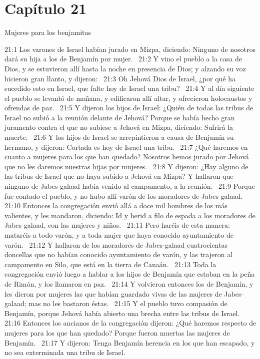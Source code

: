 \section*{Capítulo 21}
Mujeres para los benjamitas  

21:1 Los varones de Israel habían jurado en Mizpa, diciendo: Ninguno de nosotros dará su hija a los de Benjamín por mujer.  
21:2 Y vino el pueblo a la casa de Dios, y se estuvieron allí hasta la noche en presencia de Dios; y alzando su voz hicieron gran llanto, y dijeron:  
21:3 Oh Jehová Dios de Israel, ¿por qué ha sucedido esto en Israel, que falte hoy de Israel una tribu?  
21:4 Y al día siguiente el pueblo se levantó de mañana, y edificaron allí altar, y ofrecieron holocaustos y ofrendas de paz.  
21:5 Y dijeron los hijos de Israel: ¿Quién de todas las tribus de Israel no subió a la reunión delante de Jehová? Porque se había hecho gran juramento contra el que no subiese a Jehová en Mizpa, diciendo: Sufrirá la muerte.  
21:6 Y los hijos de Israel se arrepintieron a causa de Benjamín su hermano, y dijeron: Cortada es hoy de Israel una tribu.  
21:7 ¿Qué haremos en cuanto a mujeres para los que han quedado? Nosotros hemos jurado por Jehová que no les daremos nuestras hijas por mujeres.  
21:8 Y dijeron: ¿Hay alguno de las tribus de Israel que no haya subido a Jehová en Mizpa? Y hallaron que ninguno de Jabes-galaad había venido al campamento, a la reunión.  
21:9 Porque fue contado el pueblo, y no hubo allí varón de los moradores de Jabes-galaad. 
21:10 Entonces la congregación envió allá a doce mil hombres de los más valientes, y les mandaron, diciendo: Id y herid a filo de espada a los moradores de Jabes-galaad, con las mujeres y niños.  
21:11 Pero haréis de esta manera: mataréis a todo varón, y a toda mujer que haya conocido ayuntamiento de varón.  
21:12 Y hallaron de los moradores de Jabes-galaad cuatrocientas doncellas que no habían conocido ayuntamiento de varón, y las trajeron al campamento en Silo, que está en la tierra de Canaán.  
21:13 Toda la congregación envió luego a hablar a los hijos de Benjamín que estaban en la peña de Rimón, y los llamaron en paz.  
21:14 Y volvieron entonces los de Benjamín, y les dieron por mujeres las que habían guardado vivas de las mujeres de Jabes- galaad; mas no les bastaron éstas.  
21:15 Y el pueblo tuvo compasión de Benjamín, porque Jehová había abierto una brecha entre las tribus de Israel.  
21:16 Entonces los ancianos de la congregación dijeron: ¿Qué haremos respecto de mujeres para los que han quedado? Porque fueron muertas las mujeres de Benjamín.  
21:17 Y dijeron: Tenga Benjamín herencia en los que han escapado, y no sea exterminada una tribu de Israel.  
